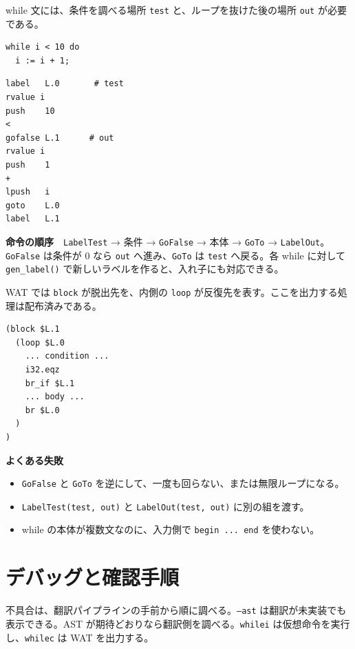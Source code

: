 \documentclass[a4paper,11pt]{ltjsarticle}
\begin{document}
while 文には、条件を調べる場所 \texttt{test} と、ループを抜けた後の場所 \texttt{out} が必要である。

\begin{minipage}[t]{0.36\textwidth}
\begin{lstlisting}
while i < 10 do
  i := i + 1;
\end{lstlisting}
\end{minipage}\hfill
\begin{minipage}[t]{0.60\textwidth}
\begin{lstlisting}
label   L.0       # test
rvalue i
push    10
<
gofalse L.1      # out
rvalue i
push    1
+
lpush   i
goto    L.0
label   L.1
\end{lstlisting}
\end{minipage}

\textbf{命令の順序}　\texttt{LabelTest} → 条件 → \texttt{GoFalse} → 本体 → \texttt{GoTo} → \texttt{LabelOut}。
\texttt{GoFalse} は条件が 0 なら \texttt{out} へ進み、\texttt{GoTo} は \texttt{test} へ戻る。各 while に対して \texttt{gen\_label()} で新しいラベルを作ると、入れ子にも対応できる。

WAT では \texttt{block} が脱出先を、内側の \texttt{loop} が反復先を表す。ここを出力する処理は配布済みである。

\begin{lstlisting}
(block $L.1
  (loop $L.0
    ... condition ...
    i32.eqz
    br_if $L.1
    ... body ...
    br $L.0
  )
)
\end{lstlisting}

\noindent\textbf{よくある失敗}
\begin{itemize}
  \item \texttt{GoFalse} と \texttt{GoTo} を逆にして、一度も回らない、または無限ループになる。
  \item \texttt{LabelTest(test, out)} と \texttt{LabelOut(test, out)} に別の組を渡す。
  \item while の本体が複数文なのに、入力側で \texttt{begin ... end} を使わない。
\end{itemize}

\clearpage
\section{デバッグと確認手順}

不具合は、翻訳パイプラインの手前から順に調べる。\texttt{--ast} は翻訳が未実装でも表示できる。AST が期待どおりなら翻訳側を調べる。\texttt{whilei} は仮想命令を実行し、\texttt{whilec} は WAT を出力する。
\end{document}
